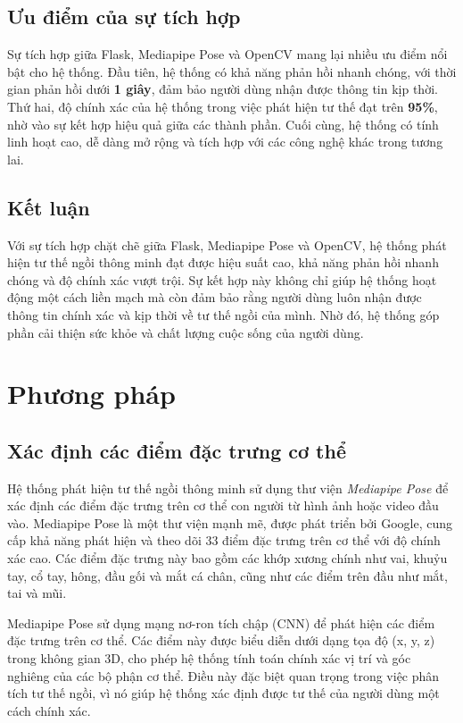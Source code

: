 \documentclass[conference]{IEEEtran}
\begin{document}
\subsection{Ưu điểm của sự tích hợp}
Sự tích hợp giữa Flask, Mediapipe Pose và OpenCV mang lại nhiều ưu điểm nổi bật cho hệ thống. Đầu tiên, hệ thống có khả năng phản hồi nhanh chóng, với thời gian phản hồi dưới \textbf{1 giây}, đảm bảo người dùng nhận được thông tin kịp thời. Thứ hai, độ chính xác của hệ thống trong việc phát hiện tư thế đạt trên \textbf{95\%}, nhờ vào sự kết hợp hiệu quả giữa các thành phần. Cuối cùng, hệ thống có tính linh hoạt cao, dễ dàng mở rộng và tích hợp với các công nghệ khác trong tương lai.

\subsection{Kết luận}
Với sự tích hợp chặt chẽ giữa Flask, Mediapipe Pose và OpenCV, hệ thống phát hiện tư thế ngồi thông minh đạt được hiệu suất cao, khả năng phản hồi nhanh chóng và độ chính xác vượt trội. Sự kết hợp này không chỉ giúp hệ thống hoạt động một cách liền mạch mà còn đảm bảo rằng người dùng luôn nhận được thông tin chính xác và kịp thời về tư thế ngồi của mình. Nhờ đó, hệ thống góp phần cải thiện sức khỏe và chất lượng cuộc sống của người dùng.


\section{Phương pháp}
\subsection{Xác định các điểm đặc trưng cơ thể}
Hệ thống phát hiện tư thế ngồi thông minh sử dụng thư viện \textit{Mediapipe Pose} để xác định các điểm đặc trưng trên cơ thể con người từ hình ảnh hoặc video đầu vào. Mediapipe Pose là một thư viện mạnh mẽ, được phát triển bởi Google, cung cấp khả năng phát hiện và theo dõi 33 điểm đặc trưng trên cơ thể với độ chính xác cao. Các điểm đặc trưng này bao gồm các khớp xương chính như vai, khuỷu tay, cổ tay, hông, đầu gối và mắt cá chân, cũng như các điểm trên đầu như mắt, tai và mũi.

Mediapipe Pose sử dụng mạng nơ-ron tích chập (CNN) để phát hiện các điểm đặc trưng trên cơ thể. Các điểm này được biểu diễn dưới dạng tọa độ (x, y, z) trong không gian 3D, cho phép hệ thống tính toán chính xác vị trí và góc nghiêng của các bộ phận cơ thể. Điều này đặc biệt quan trọng trong việc phân tích tư thế ngồi, vì nó giúp hệ thống xác định được tư thế của người dùng một cách chính xác.
\end{document}
